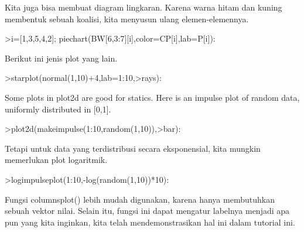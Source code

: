 \documentclass[12pt,Times new roman,letterpaper]{book}
\begin{document}
\begin{eulernootebook}
\begin{eulercomment}
\begin{eulercomment}
\begin{eulernootebook}
\begin{eulercomment}
\begin{eulercomment}
\begin{eulercomment}
\begin{eulercomment}
\begin{eulercomment}
\begin{eulercomment}
\begin{eulercomment}
\begin{eulercomment}
Kita juga bisa membuat diagram lingkaran. Karena warna hitam dan
kuning membentuk sebuah koalisi, kita menyusun ulang elemen-elemennya.
\end{eulercomment}
\begin{eulerprompt}
>i=[1,3,5,4,2]; piechart(BW[6,3:7][i],color=CP[i],lab=P[i]):
\end{eulerprompt}
\begin{eulercomment}
Berikut ini jenis plot yang lain.
\end{eulercomment}
\begin{eulerprompt}
>starplot(normal(1,10)+4,lab=1:10,>rays):
\end{eulerprompt}
\begin{eulercomment}
Some plots in plot2d are good for statics. Here is an impulse plot of random data, uniformly
distributed in [0,1].
\end{eulercomment}
\begin{eulerprompt}
>plot2d(makeimpulse(1:10,random(1,10)),>bar):
\end{eulerprompt}
\begin{eulercomment}
Tetapi untuk data yang terdistribusi secara eksponensial, kita mungkin
memerlukan plot logaritmik.
\end{eulercomment}
\begin{eulerprompt}
>logimpulseplot(1:10,-log(random(1,10))*10):
\end{eulerprompt}
\begin{eulercomment}
Fungsi columnsplot() lebih mudah digunakan, karena hanya membutuhkan
sebuah vektor nilai. Selain itu, fungsi ini dapat mengatur labelnya
menjadi apa pun yang kita inginkan, kita telah mendemonstrasikan hal
ini dalam tutorial ini.


\end{eulercomment}
\end{eulercomment}
\end{eulercomment}
\end{eulercomment}
\end{eulercomment}
\end{eulercomment}
\end{eulercomment}
\end{eulercomment}
\end{eulernootebook}
\end{eulercomment}
\end{eulercomment}
\end{eulernootebook}
\end{document}
